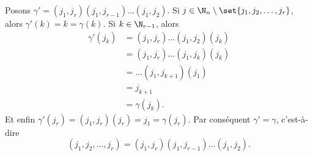 Posons $\gamma' = (j_1,j_r)(j_1,j_{r-1})\dots (j_1,j_2)$.
Si $j\in\N_n\setminus\set{j_1,j_2,\dots,j_r}$, alors $\gamma'(k) = k = \gamma(k)$.
Si $k\in\N_{r-1}$, alors
%
\begin{align*}
  \gamma'(j_k)
    &= (j_1,j_r)\dots (j_1,j_2) (j_k) \\
    &= (j_1,j_r)\dots(j_1,j_k)(j_k) \\
    &= \dots(j_1,j_{k+1})(j_1) \\
    &= j_{k+1} \\
    &= \gamma(j_k).
\end{align*}
%
Et enfin $\gamma'(j_r) = (j_1,j_r)(j_r) = j_1 = \gamma(j_r)$.
Par conséquent $\gamma' = \gamma$, c'est-à-dire
\[
  (j_1,j_2,\dots,j_r) = (j_1,j_r)(j_1,j_{r-1})\dots (j_1,j_2).
\]
